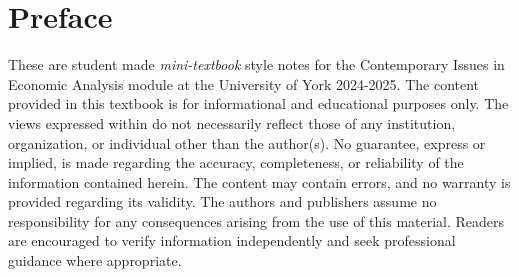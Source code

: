 \documentclass[../Main.tex]{subfiles}
\begin{document}
\chapter*{Preface}
\vfill

These are student made \textit{mini-textbook} style notes for the Contemporary
Issues in Economic Analysis module at the University of York 2024-2025. The
content provided in this textbook is for informational and educational
purposes only. The views expressed within do not necessarily reflect those of
any institution, organization, or individual other than the author(s). No
guarantee, express or implied, is made regarding the accuracy, completeness, or
reliability of the information contained herein. The content may contain errors,
and no warranty is provided regarding its validity. The authors and publishers
assume no responsibility for any consequences arising from the use of this
material. Readers are encouraged to verify information independently and seek
professional guidance where appropriate. 

\vfill
\end{document}
